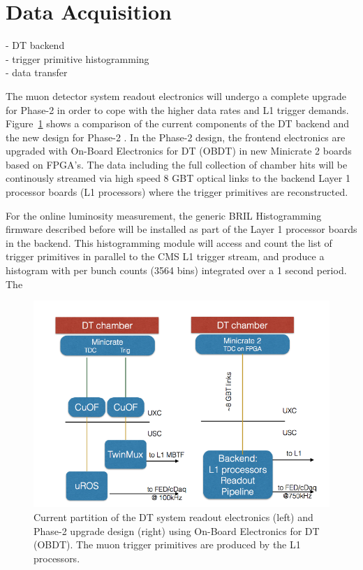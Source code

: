 \section{Data Acquisition}
- DT backend \\
- trigger primitive histogramming \\
- data transfer

The muon detector system readout electronics will undergo a complete upgrade for Phase-2 in order to cope with the higher data rates and L1 trigger demands.
Figure~\ref{fig:DT_DAQ2} shows a comparison of the current components of the DT backend and the new design for Phase-2 \cite{CERN-LHCC-2017-012}.
In the Phase-2 design, the frontend electronics are upgraded with On-Board Electronics for DT (OBDT) in new Minicrate 2 boards based on FPGA's.
The data including the full collection of chamber hits will be continously streamed via high speed 8 GBT optical links to the backend Layer 1 processor boards (L1 processors) where the trigger primitives are reconstructed.

For the online luminosity measurement, the generic BRIL Histogramming firmware described before will be installed as part of the Layer 1 processor boards in the backend.
This histogramming module will access and count the list of trigger primitives in parallel to the CMS L1 trigger stream, and produce a histogram with per bunch counts (3564 bins) integrated over a 1 second period.
The 




\begin{figure}[hbtp]
\centering
\includegraphics[width=.65\linewidth]{tex/Part2/fig/DT/DT-DAQ-Phase1_vs_Phase2.png}
\caption{Current partition of the DT system readout electronics (left) and Phase-2 upgrade design (right) using On-Board Electronics for DT (OBDT).
  The muon trigger primitives are produced by the L1 processors.
}   
\label{fig:DT_DAQ2}
\end{figure}





